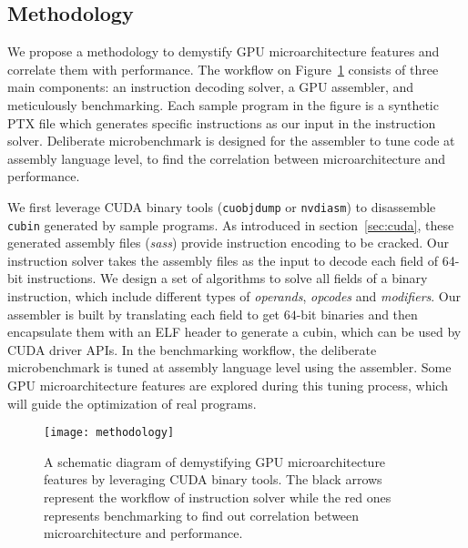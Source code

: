 \subsection{Methodology}

We propose a methodology to demystify GPU microarchitecture features and correlate them with performance.
The workflow on Figure~\ref{fig:workflow} consists of three main components: an instruction decoding solver, a GPU assembler, and meticulously
benchmarking. %
Each sample program in the figure is a synthetic PTX file which generates specific instructions as our input in the instruction solver. %
Deliberate microbenchmark is designed for the assembler to tune code at assembly language level, to find the correlation
between microarchitecture and performance.

We first leverage CUDA binary tools ({\tt cuobjdump} or {\tt nvdiasm}) to disassemble {\tt cubin} generated by sample programs. %
As introduced in section~\ref{sec:cuda}, these generated assembly files ({\em sass}) provide instruction encoding to be cracked.
Our instruction solver takes the assembly files as the input to decode each field of 64-bit instructions.
We design a set of algorithms to solve all fields of a binary instruction, which include different types of {\em operands}, {\em opcodes} and {\em modifiers}.
Our assembler is built by translating each field to get $64$-bit binaries and then encapsulate them with an ELF header to
generate a cubin, which can be used by CUDA driver APIs.
In the benchmarking workflow, the deliberate microbenchmark is tuned at assembly language level using the assembler.
Some GPU microarchitecture features are explored during this tuning process, which will guide the optimization of real programs.


\begin{figure}[htbp]
\begin{center}
\texttt{[image: methodology]}
\caption{A schematic diagram of demystifying GPU microarchitecture features by leveraging CUDA binary tools. The black arrows
represent the workflow of instruction solver while the red ones represents benchmarking to find out correlation between microarchitecture
    and performance.}%
\label{fig:workflow}
\end{center}
\end{figure}
